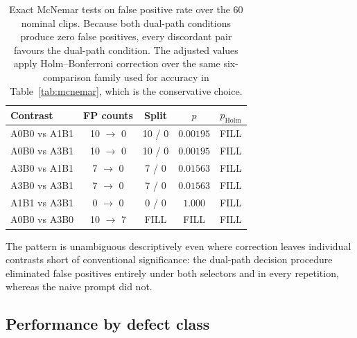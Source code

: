 \begin{table}[htbp]
\centering
\caption{Exact McNemar tests on false positive rate over the 60 nominal
clips. Because both dual-path conditions produce zero false positives,
every discordant pair favours the dual-path condition. The adjusted values
apply Holm--Bonferroni correction over the same six-comparison family used
for accuracy in Table~\ref{tab:mcnemar}, which is the conservative choice.}
\label{tab:fpr}
\small
\begin{tabular}{@{}lcccc@{}}
\toprule
Contrast & FP counts & Split & $p$ & $p_{\text{Holm}}$ \\
\midrule
A0B0 vs A1B1 & 10 $\to$ 0 & 10 / 0 & $0.00195$ & FILL \\
A0B0 vs A3B1 & 10 $\to$ 0 & 10 / 0 & $0.00195$ & FILL \\
A3B0 vs A1B1 & 7 $\to$ 0  & 7 / 0  & $0.01563$ & FILL \\
A3B0 vs A3B1 & 7 $\to$ 0  & 7 / 0  & $0.01563$ & FILL \\
A1B1 vs A3B1 & 0 $\to$ 0  & 0 / 0  & $1.000$   & FILL \\
A0B0 vs A3B0 & 10 $\to$ 7 & FILL   & FILL      & FILL \\
\bottomrule
\end{tabular}
\end{table}

The pattern is unambiguous descriptively even where correction leaves
individual contrasts short of conventional significance: the dual-path
decision procedure eliminated false positives entirely under both
selectors and in every repetition, whereas the naive prompt did not.

\subsection{Performance by defect class}

